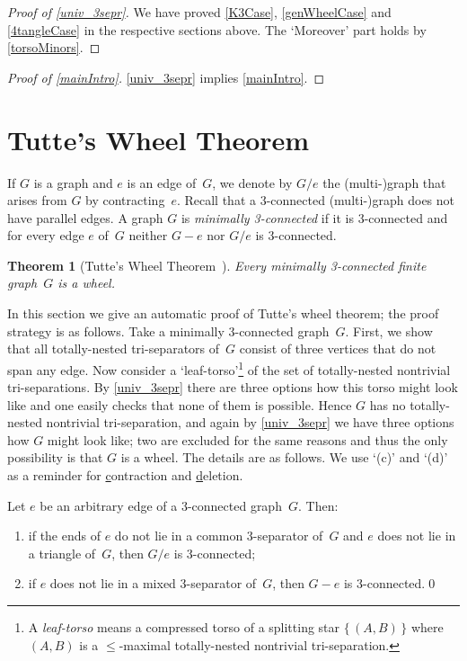 \documentclass{aic}
\theoremstyle{plain}
\newtheorem{thm}{Theorem}[section]
\theoremstyle{definition}
\theoremstyle{plain}
\theoremstyle{plain}
\renewcommand{\le}{\leqslant}
\begin{document}
\begin{proof}[Proof of \autoref{univ_3sepr}]
We have proved \ref{K3Case}, \ref{genWheelCase} and \ref{4tangleCase} in the respective sections above.
The `Moreover' part holds by \autoref{torsoMinors}.
\end{proof}

\begin{proof}[Proof of \autoref{mainIntro}]
\autoref{univ_3sepr} implies \autoref{mainIntro}.
\end{proof}




\section{Tutte's Wheel Theorem}

If $G$ is a graph and $e$ is an edge of~$G$, we denote by $G/e$ the (multi-)graph that arises from $G$ by contracting~$e$.
Recall that a 3-connected (multi-)graph does not have parallel edges.
A graph $G$ is \emph{minimally 3-connected} if it is 3-connected and for every edge $e$ of~$G$ neither $G-e$ nor $G/e$ is 3-connected.

\begin{thm}[Tutte's Wheel Theorem~\cite{TutteWheel}]\label{tutte-wheel}
    Every minimally 3-connected finite graph~$G$ is a wheel.
\end{thm}

In this section we give an automatic proof of Tutte's wheel theorem; the proof strategy is as follows. 
Take a minimally 3-connected graph~$G$. 
First, we show that all totally-nested tri-separators of~$G$ consist of three vertices that do not span any edge. 
Now consider a `leaf-torso'\footnote{A \emph{leaf-torso} means a compressed torso of a splitting star $\{\,(A,B)\,\}$ where $(A,B)$ is a $\le$-maximal totally-nested nontrivial tri-separation.} of the set of totally-nested nontrivial tri-separations. 
By \autoref{univ_3sepr} there are three options how this torso might look like and one easily checks that none of them is possible. 
Hence $G$ has no totally-nested nontrivial tri-separation, and again by \autoref{univ_3sepr} we have three options how $G$ might look like; two are excluded for the same reasons and thus the only possibility is that $G$ is a wheel.
The details are as follows.
We use `(c)' and `(d)' as a reminder for \underline{c}ontraction and \underline{d}eletion.


\begin{obs}\label{tetra-pack}
Let $e$ be an arbitrary edge of a 3-connected graph~$G$. Then:
\begin{enumerate}
    \item[\textnormal{(c)}] if the ends of $e$ do not lie in a common 3-separator of~$G$ and $e$ does not lie in a triangle of~$G$, then $G/e$ is 3-connected;
    \item[\textnormal{(d)}] if $e$ does not lie in a mixed 3-separator of~$G$, then $G-e$ is 3-connected.\qed
\end{enumerate}
\end{obs}
\end{document}
